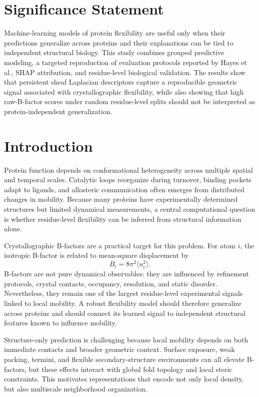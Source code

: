 \documentclass[11pt]{article}
\begin{document}
\section*{Significance Statement}
Machine-learning models of protein flexibility are useful only when their predictions generalize across proteins and their explanations can be tied to independent structural biology. This study combines grouped predictive modeling, a targeted reproduction of evaluation protocols reported by Hayes et al., SHAP attribution, and residue-level biological validation. The results show that persistent sheaf Laplacian descriptors capture a reproducible geometric signal associated with crystallographic flexibility, while also showing that high raw-B-factor scores under random residue-level splits should not be interpreted as protein-independent generalization.

\section{Introduction}
Protein function depends on conformational heterogeneity across multiple spatial and temporal scales. Catalytic loops reorganize during turnover, binding pockets adapt to ligands, and allosteric communication often emerges from distributed changes in mobility. Because many proteins have experimentally determined structures but limited dynamical measurements, a central computational question is whether residue-level flexibility can be inferred from structural information alone.

Crystallographic B-factors are a practical target for this problem. For atom $i$, the isotropic B-factor is related to mean-square displacement by
\begin{equation}
B_i = 8\pi^2 \langle u_i^2 \rangle .
\end{equation}
B-factors are not pure dynamical observables: they are influenced by refinement protocols, crystal contacts, occupancy, resolution, and static disorder. Nevertheless, they remain one of the largest residue-level experimental signals linked to local mobility. A robust flexibility model should therefore generalize across proteins and should connect its learned signal to independent structural features known to influence mobility.

Structure-only prediction is challenging because local mobility depends on both immediate contacts and broader geometric context. Surface exposure, weak packing, termini, and flexible secondary-structure environments can all elevate B-factors, but these effects interact with global fold topology and local steric constraints. This motivates representations that encode not only local density, but also multiscale neighborhood organization.
\end{document}
